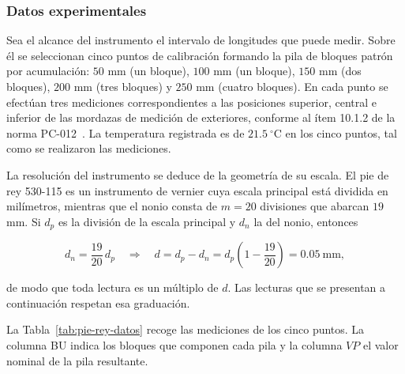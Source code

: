 \subsubsection{Datos experimentales}
\label{sec:pie-rey-datos}

Sea el alcance del instrumento el intervalo de longitudes que puede medir. Sobre él
se seleccionan cinco puntos de calibración formando la pila de bloques patrón por
acumulación: $50$ mm (un bloque), $100$ mm (un bloque), $150$ mm (dos bloques),
$200$ mm (tres bloques) y $250$ mm (cuatro bloques). En cada punto se efectúan tres
mediciones correspondientes a las posiciones superior, central e inferior de las
mordazas de medición de exteriores, conforme al ítem 10.1.2 de la norma
PC-012~\parencite{inacal_pc012}. La
temperatura registrada es de $21.5\ ^\circ$C en los cinco puntos, tal como se
realizaron las mediciones.

La resolución del instrumento se deduce de la geometría de su escala. El pie de rey
530-115 es un instrumento de vernier cuya escala principal está dividida en
milímetros, mientras que el nonio consta de $m = 20$ divisiones que abarcan $19$ mm.
Si $d_p$ es la división de la escala principal y $d_n$ la del nonio, entonces

\begin{equation}
    d_n = \frac{19}{20}\,d_p \quad\Longrightarrow\quad
    d = d_p - d_n = d_p\left(1 - \frac{19}{20}\right) = 0.05\ \text{mm},
    \label{eq:resolucion-vernier}
\end{equation}

de modo que toda lectura es un múltiplo de $d$. Las lecturas que se presentan a
continuación respetan esa graduación.

La Tabla~\ref{tab:pie-rey-datos} recoge las mediciones de los cinco puntos. La
columna BU indica los bloques que componen cada pila y la columna $VP$ el valor
nominal de la pila resultante.


